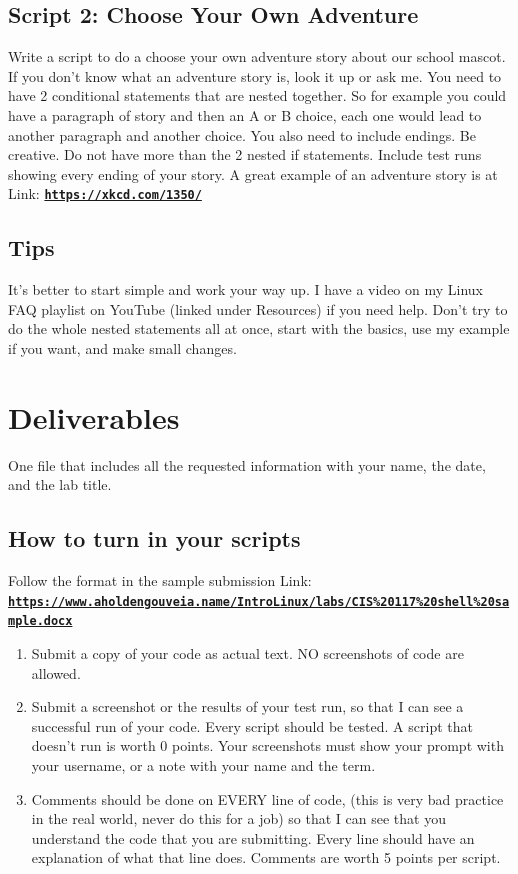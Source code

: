 \documentclass[12pt]{article}
\begin{document}
\subsection*{Script 2: Choose Your Own Adventure}
Write a script to do a choose your own adventure story about our school mascot.  If you don't know what an adventure story is, look it up or ask me. You need to have 2 conditional statements that are nested together.  So for example you could have a paragraph of story and then an A or B choice, each one would lead to another paragraph and another choice.  You also need to include endings. Be creative.   Do not have more than the 2 nested if statements.   Include test runs showing every ending of your story. A great example of an adventure story is at Link: \href{https://xkcd.com/1350/}{\textbf{\nolinkurl{https://xkcd.com/1350/}}}

\subsection*{Tips}
It's better to start simple and work your way up.  I have a video on my Linux FAQ playlist on YouTube (linked under Resources) if you need help. Don't try to do the whole nested statements all at once, start with the basics, use my example if you want, and make small changes.

\section*{Deliverables}
One file that includes all the requested information with your name, the date, and the lab title.

\subsection*{How to turn in your scripts}
Follow the format in the sample submission Link: \href{https://www.aholdengouveia.name/IntroLinux/labs/CIS\%20117\%20shell\%20sample.docx}{\textbf{\nolinkurl{https://www.aholdengouveia.name/IntroLinux/labs/CIS\%20117\%20shell\%20sample.docx}}}
    \begin{enumerate}
        \item Submit a copy of your code as actual text. NO screenshots of code are allowed.
        \item Submit a screenshot or the results of your test run, so that I can see a successful run of your code. Every script should be tested.  A script that doesn't run is worth 0 points. Your screenshots must show your prompt with your username, or a note with your name and the term.
        \item Comments should be done on EVERY line of code, (this is very bad practice in the real world, never do this for a job) so that I can see that you understand the code that you are submitting. Every line should have an explanation of what that line does.  Comments are worth 5 points per script.
\end{enumerate}
\end{document}
